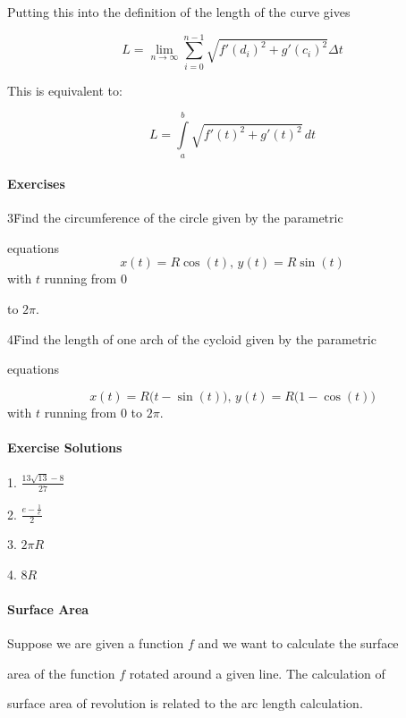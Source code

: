 Putting this into the definition of the length of the curve gives



$$L=\lim _{n\to\infty}\sum _{i=0}^{n-1}\sqrt{f'(d _i)^2+g'(c _i)^2}\Delta t$$

This is equivalent to:



$$L=\int\limits _a^b \sqrt{f'(t)^2+g'(t)^2}\,dt$$



\paragraph{Exercises}



3\. Find the circumference of the circle given by the parametric

equations $$x(t)=R\cos(t) \text{, } y(t)=R\sin(t)$$ with $t$ running from $0$

to $2\pi$.



4\. Find the length of one arch of the cycloid given by the parametric

equations 

$$x(t)=R\bigl(t-\sin(t)\bigr) \text{, } y(t)=R\bigl(1-\cos(t)\bigr)$$ with $t$ running from $0$ to $2\pi$.



\paragraph{Exercise Solutions}



1.  $\frac{13\sqrt{13}-8}{27}$

2.  $\frac{e-\frac{1}{e}}{2}$

3.  $2\pi R$

4.  $8R$



\paragraph{Surface Area}



Suppose we are given a function $f$ and we want to calculate the surface

area of the function $f$ rotated around a given line. The calculation of

surface area of revolution is related to the arc length calculation.



